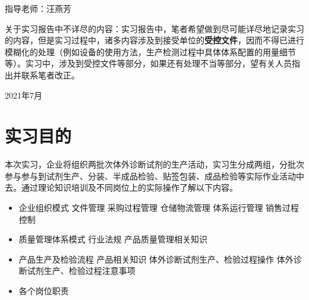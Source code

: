 \documentclass[cn,black,12pt,normal]{elegantnote}
\begin{document}
\begin{titlepage}
\begin{flushleft}
        \hspace{0.3\textwidth}
        指导老师：汪燕芳
    \end{flushleft}
    \vspace{0.05\textheight}
    \begin{flushleft}
        {\scriptsize 关于实习报告中不详尽的内容：实习报告中，笔者希望做到尽可能详尽地记录实习的内容，但是实习过程中，诸多内容涉及到接受单位的\textbf{受控文件}，因而不得已进行模糊化的处理（例如设备的使用方法，生产检测过程中具体体系配置的用量细节等）。实习中，涉及到受控文件等部分，如果还有处理不当等部分，望有关人员指出并联系笔者改正。}
    \end{flushleft}
    \vfill  %
    
    {\large 2021年7月}



\end{titlepage}

\newpage
\tableofcontents
\newpage

\section{实习目的}

本次实习，企业将组织两批次体外诊断试剂的生产活动，实习生分成两组，分批次参与参与到试剂生产、分装、半成品检验、贴签包装、成品检验等实际作业活动中去。通过理论知识培训及不同岗位上的实际操作了解以下内容。

\begin{itemize}
    \item 企业组织模式
        \subitem 文件管理
        \subitem 采购过程管理
        \subitem 仓储物流管理
        \subitem 体系运行管理
        \subitem 销售过程控制
    \item 质量管理体系模式
        \subitem 行业法规
        \subitem 产品质量管理相关知识
    \item 产品生产及检验流程
        \subitem 产品相关知识
        \subitem 体外诊断试剂生产、检验过程操作
        \subitem 体外诊断试剂生产、检验过程注意事项
    \item 各个岗位职责
\end{itemize}
\end{document}
